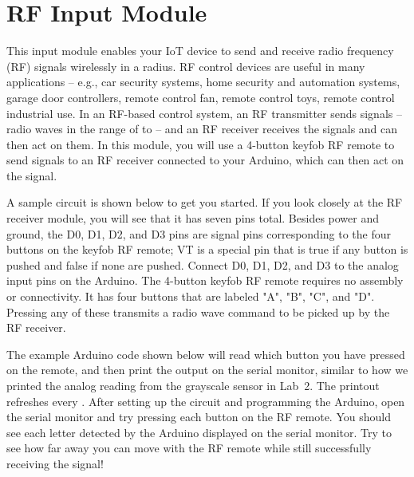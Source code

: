 
\clearpage
\section{RF Input Module}
\label{sec-input-rf}

This input module enables your IoT device to send and receive radio
frequency (RF) signals wirelessly in a  radius. RF control
devices are useful in many applications -- e.g., car security systems,
home security and automation systems, garage door controllers, remote
control fan, remote control toys, remote control industrial use. In an
RF-based control system, an RF transmitter sends signals -- radio waves
in the range of  to  -- and an RF receiver
receives the signals and can then act on them. In this module, you will
use a 4-button keyfob RF remote to send  signals to an RF
receiver connected to your Arduino, which can then act on the signal.

A sample circuit is shown below to get you started. If you look closely
at the RF receiver module, you will see that it has seven pins total.
Besides power and ground, the D0, D1, D2, and D3 pins are signal pins
corresponding to the four buttons on the keyfob RF remote; VT is a
special pin that is true if any button is pushed and false if none are
pushed. Connect D0, D1, D2, and D3 to the analog input pins on the
Arduino. The 4-button keyfob RF remote requires no assembly or
connectivity. It has four buttons that are labeled "A", "B", "C", and
"D". Pressing any of these transmits a  radio wave command
to be picked up by the RF receiver.

The example Arduino code shown below will read which button you have
pressed on the remote, and then print the output on the serial monitor,
similar to how we printed the analog reading from the grayscale sensor
in Lab~2. The printout refreshes every . After setting up the
circuit and programming the Arduino, open the serial monitor and try
pressing each button on the RF remote. You should see each letter
detected by the Arduino displayed on the serial monitor. Try to see how
far away you can move with the RF remote while still successfully
receiving the signal!

